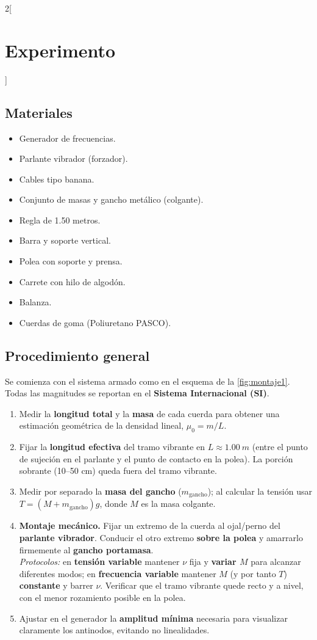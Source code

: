 \begin{multicols}{2}[\section*{Experimento}]

\subsection*{Materiales}
\begin{itemize}
\item Generador de frecuencias.
\item Parlante vibrador (forzador).
\item Cables tipo banana.
\item Conjunto de masas y gancho metálico (colgante).
\item Regla de 1.50 metros.
\item Barra y soporte vertical.
\item Polea con soporte y prensa.
\item Carrete con hilo de algodón.
\item Balanza.
\item Cuerdas de goma (Poliuretano PASCO).
\end{itemize}

\subsection*{Procedimiento general}
Se comienza con el sistema armado como en el esquema de la \cref{fig:montaje1}. Todas las magnitudes se reportan en el \textbf{Sistema Internacional (SI)}.
\begin{enumerate}[label=\textbf{\arabic*.}, leftmargin=*]
\item Medir la \textbf{longitud total} y la \textbf{masa} de cada cuerda para obtener una estimación geométrica de la densidad lineal, $\mu_0=m/L$.
\item Fijar la \textbf{longitud efectiva} del tramo vibrante en $L\approx\SI{1.00}{m}$ (entre el punto de sujeción en el parlante y el punto de contacto en la polea). La porción sobrante (10–50 cm) queda fuera del tramo vibrante.
\item Medir por separado la \textbf{masa del gancho} ($m_{\text{gancho}}$); al calcular la tensión usar $T=(M+m_{\text{gancho}})g$, donde $M$ es la masa colgante.
\item \textbf{Montaje mecánico.} Fijar un extremo de la cuerda al ojal/perno del \textbf{parlante vibrador}. Conducir el otro extremo \textbf{sobre la polea} y amarrarlo firmemente al \textbf{gancho portamasa}.\\
\emph{Protocolos:} en \textbf{tensión variable} mantener $\nu$ fija y \textbf{variar $M$} para alcanzar diferentes modos; en \textbf{frecuencia variable} mantener $M$ (y por tanto $T$) \textbf{constante} y barrer $\nu$. Verificar que el tramo vibrante quede recto y a nivel, con el menor rozamiento posible en la polea.
\item Ajustar en el generador la \textbf{amplitud mínima} necesaria para visualizar claramente los antinodos, evitando no linealidades.
\end{enumerate}


\end{multicols}

